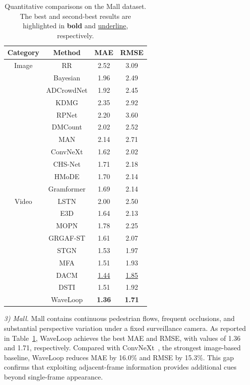 \documentclass[lettersize,journal]{IEEEtran}
\begin{document}
\begin{table}[h]
\caption{Quantitative comparisons on the Mall dataset. The best and second-best results are highlighted in \textbf{bold} and \underline{underline}, respectively.}
\centering
\scriptsize
\begin{tabular}{@{}cccc@{}}
\toprule
Category & Method & MAE & RMSE  \\ 
\midrule
Image & RR \cite{wan2019residual}  & 2.52 & 3.09 \\
& Bayesian \cite{ma2019bayesian}  & 1.96 & 2.49 \\ 
& ADCrowdNet \cite{liu2019adcrowdnet}  & 1.92 & 2.45 \\
& KDMG \cite{wan2020kernel}  & 2.35 & 2.92 \\
& RPNet \cite{yang2020reverse}  & 2.20 & 3.60 \\
& DMCount \cite{wang2020distribution}  & 2.02 & 2.52 \\
& MAN \cite{lin2022boosting}  & 2.14 & 2.71 \\
& ConvNeXt \cite{liu2022convnet}  & 1.62 & 2.02 \\
& CHS-Net \cite{dai2023cross}  & 1.71 & 2.18 \\
& HMoDE \cite{du2023redesigning}  & 1.70 & 2.14 \\
& Gramformer \cite{lin2024gramformer}  & 1.69 & 2.14 \\
\midrule
Video & LSTN \cite{fang2019locality}  &2.00 & 2.50 \\
& E3D \cite{zou2019enhanced}  & 1.64 & 2.13 \\
& MOPN \cite{hossain2020video}  & 1.78 & 2.25 \\
& GRGAF-ST \cite{cai2022global}  &1.61 & 2.07 \\
& STGN \cite{wu2022spatial}  & 1.53 & 1.97 \\
& MFA \cite{ling2023motional}  & 1.51 & 1.93 \\
& DACM \cite{ling2025dual}  & \underline{1.44} & \underline{1.85} \\
& DSTI \cite{ling2026dual}  & 1.51 & 1.92 \\
& WaveLoop & \textbf{1.36}& \textbf{1.71}\\
\bottomrule
\end{tabular}
\label{tab:3}
\vspace{-1em}
\end{table}

\textit{3) Mall.}
Mall contains continuous pedestrian flows, frequent occlusions, and substantial perspective variation under a fixed surveillance camera. As reported in Table~\ref{tab:3}, WaveLoop achieves the best MAE and RMSE, with values of 1.36 and 1.71, respectively. Compared with ConvNeXt~\cite{liu2022convnet}, the strongest image-based baseline, WaveLoop reduces MAE by 16.0\% and RMSE by 15.3\%. This gap confirms that exploiting adjacent-frame information provides additional cues beyond single-frame appearance.
\end{document}
